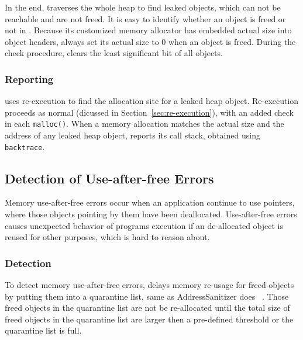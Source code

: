 \begin{comment}
For those values falling into the middle of a heap object, \doubletake{} leverages the same bitmap of canaries to locate the starting address of this object when a value is not the starting address of an object. 
\end{comment}

In the end, \doubletake{} traverses the whole heap to find leaked objects, which can not be reachable and are not freed. 
It is easy to identify whether an object is freed or not in \doubletake{}. Because its customized memory allocator has embedded actual size into object headers, \doubletake{} always set its actual size to 0 when an object is freed. 
During the check procedure, \doubletake{} clears the least significant bit of all objects. 

\subsubsection{Reporting}
\label{sec:leakreport}
\doubletake{} uses re-execution to find the allocation site for a leaked heap object. Re-execution proceeds as normal (dicussed in Section~\ref{sec:re-execution}), with an added check in each \texttt{malloc()}.
When a memory allocation matches the actual size and the address of any leaked heap object, \doubletake{} reports its call stack, obtained using \texttt{backtrace}. 

\subsection{Detection of Use-after-free Errors}
\label{sec:danglingpointer}
Memory use-after-free errors occur when an application continue to use pointers, where those objects pointing by them have been deallocated.  
Use-after-free errors causes unexpected behavior of programs execution if an de-allocated object is reused for other purposes, which is hard to reason about. 

\subsubsection{Detection}
To detect memory use-after-free errors, \doubletake{} delays memory re-usage for freed objects by putting them into a quarantine list, same as AddressSanitizer does ~\cite{AddressSanitizer}. 
Those freed objects in the quarantine list are not be re-allocated until the total size of freed objects in the quarantine list are larger then a pre-defined threshold or the quarantine list is full.

